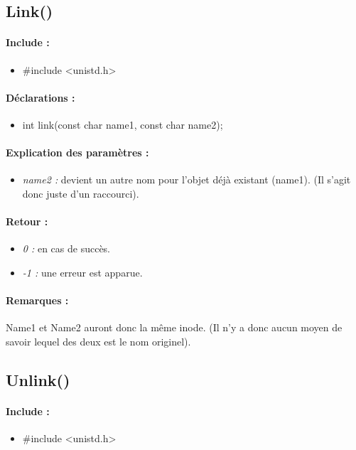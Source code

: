 \documentclass{article}[12pt]
\begin{document}
\subsection{Link()}
\paragraph{Include : }
\begin{itemize}
	\item \#include <unistd.h>
\end{itemize}
\paragraph{Déclarations : }
\begin{itemize}
	\item int link(const char \* name1, const char \* name2);
\end{itemize}
\paragraph{Explication des paramètres : }
\begin{itemize}
	\item \emph{name2 : } devient un autre nom pour l'objet déjà existant (name1). (Il s'agit donc juste d'un raccourci).
\end{itemize}
\paragraph{Retour : }
\begin{itemize}
	\item \emph{0 : } en cas de succès.
	\item \emph{-1 : } une erreur est apparue.
\end{itemize}
\paragraph{Remarques : }
Name1 et Name2 auront donc la même inode. (Il n'y a donc aucun moyen de savoir lequel des deux est le nom originel).
\subsection{Unlink()}
\paragraph{Include : }
\begin{itemize}
	\item \#include <unistd.h>
\end{itemize}
\end{document}
